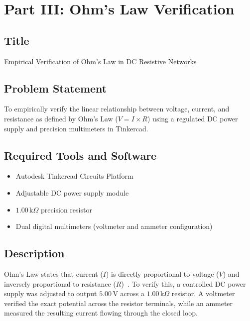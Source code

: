 \documentclass[11pt,a4paper]{article}
\begin{document}
\section{Part III: Ohm's Law Verification}

\subsection{Title}
Empirical Verification of Ohm's Law in DC Resistive Networks

\subsection{Problem Statement}
To empirically verify the linear relationship between voltage, current, and resistance as defined by Ohm's Law ($V = I \times R$) using a regulated DC power supply and precision multimeters in Tinkercad.

\subsection{Required Tools and Software}
\begin{itemize}
    \item Autodesk Tinkercad Circuits Platform~\cite{ref_tinkercad}
    \item Adjustable DC power supply module
    \item $1.00\,\text{k}\Omega$ precision resistor
    \item Dual digital multimeters (voltmeter and ammeter configuration)
\end{itemize}

\subsection{Description}
Ohm's Law states that current ($I$) is directly proportional to voltage ($V$) and inversely proportional to resistance ($R$)~\cite{ref_boylestad,ref_floyd}. To verify this, a controlled DC power supply was adjusted to output $5.00\,\text{V}$ across a $1.00\,\text{k}\Omega$ resistor. A voltmeter verified the exact potential across the resistor terminals, while an ammeter measured the resulting current flowing through the closed loop.
\end{document}
